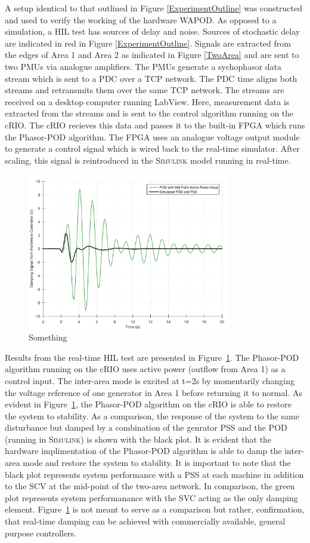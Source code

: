 \documentclass[conference]{IEEEtran}
\begin{document}
A setup identical to that outlined in Figure \ref{ExperimentOutline} was constructed and used to verify the working of the hardware WAPOD. As opposed to a simulation, a HIL test has sources of delay and noise. Sources of stochastic delay are indicated in red in Figure \ref{ExperimentOutline}. Signals are extracted from the edges of Area 1 and Area 2 as indicated in Figure \ref{TwoArea} and are sent to two PMUs via analogue amplifiers. The PMUs generate a sychophasor data stream which is sent to a PDC over a TCP network. The PDC time aligns both streams and retransmits them over the same TCP network. The streams are received on a desktop computer running LabView. Here, measurement data is extracted from the streams and is sent to the control algorithm running on the cRIO. The cRIO recieves this data and passes it to the built-in FPGA which runs the Phasor-POD algorithm. The FPGA uses an analogue voltage output module to generate a control signal which is wired back to the real-time simulator. After scaling, this signal is reintroduced in the \textsc{Simulink} model running in real-time.\\
\begin{figure}[!h]
\includegraphics[width=3.5in]{SVC_ResponseComparison_Labelled.pdf} 
\caption{Something}
\label{HILGraph}
\end{figure}
Results from the real-time HIL test are presented in Figure~\ref{HILGraph}. The Phasor-POD algorithm running on the cRIO uses active power (outflow from Area 1) as a control input. The inter-area mode is excited at t=2s by momentarily changing the voltage reference of one generator in Area 1 before returning it to normal. As evident in Figure~\ref{HILGraph}, the Phasor-POD algorithm on the cRIO is able to restore the system to stability. As a comparison, the response of the system to the same disturbance but damped by a combination of the genrator PSS and the POD (running in \textsc{Simulink}) is shown with the black plot. It is evident that the hardware implimentation of the Phasor-POD algorithm is able to damp the inter-area mode and restore the system to stability. It is important to note that the black plot represents system performance with a PSS at each machine in addition to the SCV at the mid-point of the two-area network. In comparison, the green plot represents system performanance with the SVC acting as the only damping element. Figure~\ref{HILGraph} is not meant to serve as a comparison but rather, confirmation, that real-time damping can be achieved with commercially available, general purpose controllers.
\end{document}
